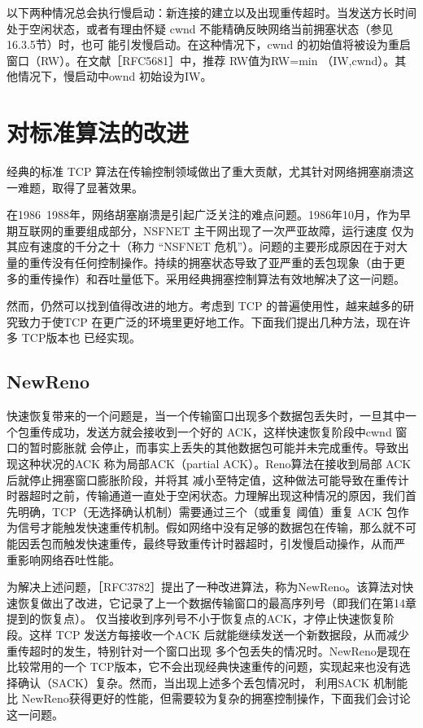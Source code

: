 以下两种情况总会执行慢启动：新连接的建立以及出现重传超时。当发送方长时间处于空闲状态，或者有理由怀疑 cwnd 不能精确反映网络当前拥塞状态（参见16.3.5节）时，也可
能引发慢启动。在这种情况下，cwnd 的初始值将被设为重启窗口（RW）。在文献［RFC5681］中，推荐 RW值为RW=min （IW,cwnd）。其他情况下，慢启动中ownd 初始设为IW。

\section{对标准算法的改进}
经典的标准 TCP 算法在传输控制领域做出了重大贡献，尤其针对网络拥塞崩溃这一难题，取得了显著效果。

\begin{tcolorbox}
    在1986~1988年，网络胡塞崩溃是引起广泛关注的难点问题。1986年10月，作为早期互联网的重要组成部分，NSFNET 主干网出现了一次严亚故障，运行速度
    仅为其应有速度的千分之十（称力 “NSFNET 危机”）。问题的主要形成原因在于对大量的重传没有任何控制操作。持续的拥塞状态导致了亚严重的丢包现象（由于更
    多的重传操作）和吞吐量低下。采用经典拥塞控制算法有效地解决了这一问题。
\end{tcolorbox}


然而，仍然可以找到值得改进的地方。考虑到 TCP 的普遍使用性，越来越多的研究致力于使TCP 在更广泛的环境里更好地工作。下面我们提出几种方法，现在许多 TCP版本也
已经实现。

\subsection{NewReno}
快速恢复带来的一个问题是，当一个传输窗口出现多个数据包丢失时，一旦其中一个包重传成功，发送方就会接收到一个好的 ACK，这样快速恢复阶段中cwnd 窗口的暂时膨胀就
会停止，而事实上丢失的其他数据包可能并未完成重传。导致出现这种状况的ACK 称为局部ACK（partial ACK）。Reno算法在接收到局部 ACK 后就停止拥塞窗口膨胀阶段，并将其
减小至特定值，这种做法可能导致在重传计时器超时之前，传输通道一直处于空闲状态。力理解出现这种情况的原因，我们首先明确，TCP（无选择确认机制）需要通过三个（或重复
阈值）重复 ACK 包作为信号才能触发快速重传机制。假如网络中没有足够的数据包在传输，那么就不可能因丢包而触发快速重传，最终导致重传计时器超时，引发慢启动操作，从而严
重影响网络吞吐性能。

为解决上述问题，［RFC3782］提出了一种改进算法，称为NewReno。该算法对快速恢复做出了改进，它记录了上一个数据传输窗口的最高序列号（即我们在第14章提到的恢复点）。
仅当接收到序列号不小于恢复点的ACK，才停止快速恢复阶段。这样 TCP 发送方每接收一个ACK 后就能继续发送一个新数据段，从而减少重传超时的发生，特别针对一个窗口出现
多个包丢失的情况时。NewReno是现在比较常用的一个 TCP版本，它不会出现经典快速重传的问题，实现起来也没有选择确认（SACK）复杂。然而，当出现上述多个丢包情况时，
利用SACK 机制能比 NewReno获得更好的性能，但需要较为复杂的拥塞控制操作，下面我们会讨论这一问题。

